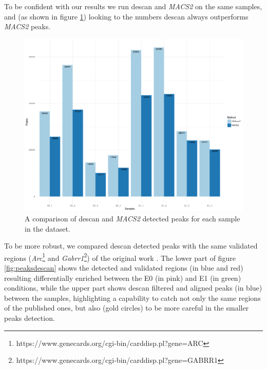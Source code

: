 To be confident with our results we run \gls{descan} and \textit{MACS2} on the same samples, and (as shown in figure \ref{fig:des2m2peaks}) looking to the numbers \gls{descan} always outperforms \textit{MACS2} peaks.

\begin{figure}[H]
\includegraphics[width=\textwidth,height=\textheight,keepaspectratio]{img/descan2/d2m2_peaks_number.png}
\caption[The \gls{descan} and \textit{MACS2} peaks detection]{A comparison of \gls{descan} and \textit{MACS2} detected peaks for each sample in the dataset.}
\label{fig:des2m2peaks}
\centering
\end{figure}

To be more robust, we compared \gls{descan} detected peaks with the same validated regions (\textit{Arc}\footnote{https://www.genecards.org/cgi-bin/carddisp.pl?gene=ARC} and \textit{Gabrr1}\footnote{https://www.genecards.org/cgi-bin/carddisp.pl?gene=GABRR1}) of the original work \cite{Su2017}.
The lower part of figure \ref{fig:peaksdescan} shows the detected and validated regions (in blue and red) resulting differentially enriched between the E0 (in pink) and E1 (in green) conditions, while the upper part shows \gls{descan} filtered and aligned peaks (in blue) between the samples, highlighting a capability to catch not only the same regions of the published ones, but also (gold circles) to be more careful in the smaller peaks detection.

